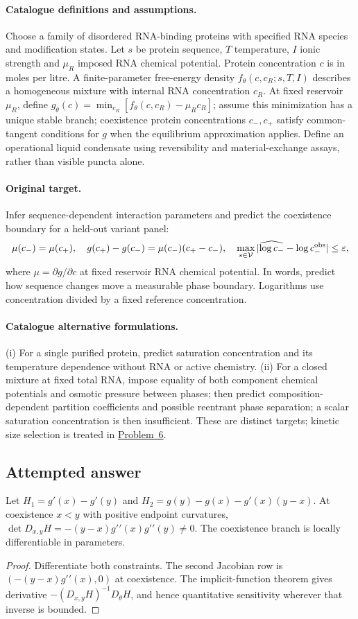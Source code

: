 \documentclass[11pt]{article}
\begin{document}
\paragraph{Catalogue definitions and assumptions.}
Choose a family of disordered RNA-binding proteins with specified RNA species and modification states. Let $s$ be protein sequence, $T$ temperature, $I$ ionic strength and $\mu_R$ imposed RNA chemical potential. Protein concentration $c$ is in moles per litre. A finite-parameter free-energy density $f_\theta(c,c_R;s,T,I)$ describes a homogeneous mixture with internal RNA concentration $c_R$. At fixed reservoir $\mu_R$, define $g_\theta(c)=\min_{c_R}[f_\theta(c,c_R)-\mu_Rc_R]$; assume this minimization has a unique stable branch; coexistence protein concentrations $c_-,c_+$ satisfy common-tangent conditions for $g$ when the equilibrium approximation applies. Define an operational liquid condensate using reversibility and material-exchange assays, rather than visible puncta alone.
\paragraph{Original target.}
Infer sequence-dependent interaction parameters and predict the coexistence boundary for a held-out variant panel:
\[
\mu(c_-)=\mu(c_+),\quad
g(c_+)-g(c_-)=\mu(c_-)(c_+-c_-),\quad
\max_{s\in\mathcal V}|\widehat{\log c_-}-\log c_-^{\rm obs}|\leq\varepsilon,
\]
where $\mu=\partial g/\partial c$ at fixed reservoir RNA chemical potential. In words, predict how sequence changes move a measurable phase boundary. Logarithms use concentration divided by a fixed reference concentration.
\paragraph{Catalogue alternative formulations.}
(i) For a single purified protein, predict saturation concentration and its temperature dependence without RNA or active chemistry. (ii) For a closed mixture at fixed total RNA, impose equality of both component chemical potentials and osmotic pressure between phases; then predict composition-dependent partition coefficients and possible reentrant phase separation; a scalar saturation concentration is then insufficient. These are distinct targets; kinetic size selection is treated in \href{https://we-solve.github.io/problems/nonequilibrium-condensates-897aba0c/}{Problem~6}.
\subsection{Attempted answer}
\begin{proposition}
Let $H_1=g\prime(x)-g\prime(y)$ and $H_2=g(y)-g(x)-g\prime(x)(y-x)$. At coexistence $x<y$ with positive endpoint curvatures, $\det D_{x,y}H=-(y-x)g\prime\prime(x)g\prime\prime(y)\ne0$. The coexistence branch is locally differentiable in parameters.
\end{proposition}
\begin{proof}
Differentiate both constraints. The second Jacobian row is $(-(y-x)g\prime\prime(x),0)$ at coexistence. The implicit-function theorem gives derivative $-(D_{x,y}H)^{-1}D_\theta H$, and hence quantitative sensitivity wherever that inverse is bounded.
\end{proof}
\end{document}
